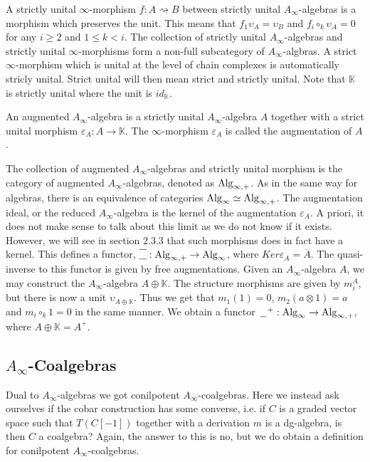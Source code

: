 \documentclass[../thesis.tex]{subfiles}
\begin{document}
        A strictly unital $\infty$-morphism $f: A \rightsquigarrow B$ between strictly unital $A_\infty$-algebras is a morphism which preserves the unit. This means that $f_1\upsilon_A = \upsilon_B$ and $f_i \circ_k \upsilon_A = 0$ for any $i \geq 2$ and $1 \leq k < i$. The collection of strictly unital $A_\infty$-algebras and strictly unital $\infty$-morphisms form a non-full subcategory of $A_\infty$-algbras. A strict $\infty$-morphism which is unital at the level of chain complexes is automatically stricly unital. Strict unital will then mean strict and strictly unital. Note that $\mathbb{K}$ is strictly unital where the unit is $id_\mathbb{K}$.

        \begin{definition}\label{def: augmented-sha}
            An augmented $A_\infty$-algebra is a strictly unital $A_\infty$-algebra $A$ together with a strict unital morphism $\varepsilon_A : A \rightarrow \mathbb{K}$. The $\infty$-morphism $\varepsilon_A$ is called the augmentation of $A$.
        \end{definition}

        The collection of augmented $A_\infty$-algebras and strictly unital morphism is the category of augmented $A_\infty$-algebras, denoted as $\tt{Alg}_{\infty,+}$. As in the same way for algebras, there is an equivalence of categories $\tt{Alg}_\infty \simeq \tt{Alg}_{\infty,+}$. The augmentation ideal, or the reduced $A_\infty$-algebra is the kernel of the augmentation $\varepsilon_A$. A priori, it does not make sense to talk about this limit as we do not know if it exists. However, we will see in section 2.3.3 that such morphisms does in fact have a kernel. This defines a functor, $\overline{\underline{\phantom{A}}} : \tt{Alg}_{\infty ,+} \rightarrow \tt{Alg}_\infty$, where $Ker\varepsilon_A = \overline{A}$. The quasi-inverse to this functor is given by free augmentations. Given an $A_\infty$-algebra $A$, we may construct the $A_\infty$-algebra $A\oplus \mathbb{K}$. The structure morphisms are given by $m_i^A$, but there is now a unit $\upsilon_{A\oplus\mathbb{K}}$. Thus we get that $m_1(1) = 0$, $m_2 (a\otimes 1) = a$ and $m_i \circ_k 1 = 0$ in the same manner. We obtain a functor $\argument^+ : \tt{Alg}_\infty \rightarrow \tt{Alg}_{\infty, +}$, where $A\oplus \mathbb{K} = A^+$.

    \subsection{$A_\infty$-Coalgebras}    
        Dual to $A_\infty$-algebras we got conilpotent $A_\infty$-coalgebras. Here we instead ask ourselves if the cobar construction has some converse, i.e. if $C$ is a graded vector space such that $T(C[-1])$ together with a derivation $m$ is a dg-algebra, is then $C$ a coalgebra? Again, the answer to this is no, but we do obtain a definition for conilpotent $A_\infty$-coalgebras.
\end{document}

